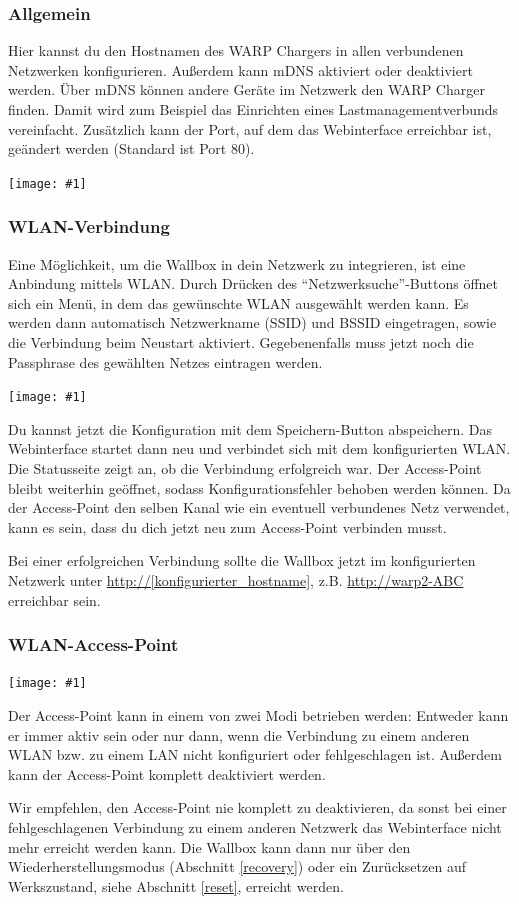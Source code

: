 \documentclass[a4paper,10pt]{article}
\newcommand{\hint}[1]{\begin{tcolorbox}[colback=boxgray,colframe=black,coltext=
white,title=Hinweis,left*=2mm,right*=2mm,boxsep=1mm,bottom=1mm,top=1mm]#1\end{tcolorbox}}
\newcommand{\gfx}[1]{\texttt{[image: \#1]}}
\begin{document}
\begin{multicols*}{2}
    \subsubsection{Allgemein}
    Hier kannst du den Hostnamen des WARP Chargers in allen verbundenen Netzwerken konfigurieren. Außerdem kann mDNS aktiviert oder deaktiviert werden.
    Über mDNS können andere Geräte im Netzwerk den WARP Charger finden. Damit
    wird zum Beispiel das Einrichten eines Lastmanagementverbunds vereinfacht.
    Zusätzlich kann der Port, auf dem das Webinterface erreichbar ist, geändert werden (Standard ist
    Port 80).

    \gfx{./img_warp2/resized/web_network}


    \subsubsection{WLAN-Verbindung}
    Eine Möglichkeit, um die Wallbox in dein Netzwerk zu integrieren, ist eine
    Anbindung mittels WLAN.
    Durch Drücken des \enquote{Netzwerksuche}-Buttons öffnet sich ein Menü, in dem das gewünschte WLAN ausgewählt werden kann.
    Es werden dann automatisch Netzwerkname (SSID) und BSSID eingetragen, sowie die Verbindung beim Neustart aktiviert.
    Gegebenenfalls muss jetzt noch die Passphrase des gewählten Netzes eintragen
	werden.

    \gfx{./img_warp2/resized/web_wifi_sta}

    Du kannst jetzt die Konfiguration mit dem Speichern-Button abspeichern.
    Das Webinterface startet dann neu und verbindet sich mit dem konfigurierten WLAN. Die Statusseite zeigt
    an, ob die Verbindung erfolgreich war. Der Access-Point bleibt weiterhin
    geöffnet, sodass Konfigurationsfehler behoben werden können.
    Da der Access-Point den selben Kanal wie ein eventuell verbundenes Netz verwendet,
    kann es sein, dass du dich jetzt neu zum Access-Point verbinden musst.

    Bei einer erfolgreichen Verbindung sollte die Wallbox jetzt im konfigurierten Netzwerk unter
    \url{http://[konfigurierter_hostname]}, z.B. \url{http://warp2-ABC} erreichbar sein.

    \subsubsection{WLAN-Access-Point}
    \gfx{./img_warp2/resized/web_wifi_ap}

    Der Access-Point kann in einem von zwei Modi betrieben werden: Entweder kann er immer aktiv sein
    oder nur dann, wenn die Verbindung zu einem anderen WLAN bzw. zu einem LAN nicht konfiguriert oder fehlgeschlagen ist.
    Außerdem kann der Access-Point komplett deaktiviert werden.
    \hint{Wir empfehlen, den Access-Point nie komplett zu deaktivieren, da sonst bei einer
        fehlgeschlagenen Verbindung zu einem anderen Netzwerk das Webinterface nicht mehr erreicht
        werden kann. Die Wallbox kann dann nur über den Wiederherstellungsmodus
        (Abschnitt \ref{recovery}) oder ein Zurücksetzen auf Werkszustand, siehe Abschnitt \ref{reset}, erreicht werden.}


\end{multicols*}
\end{document}

